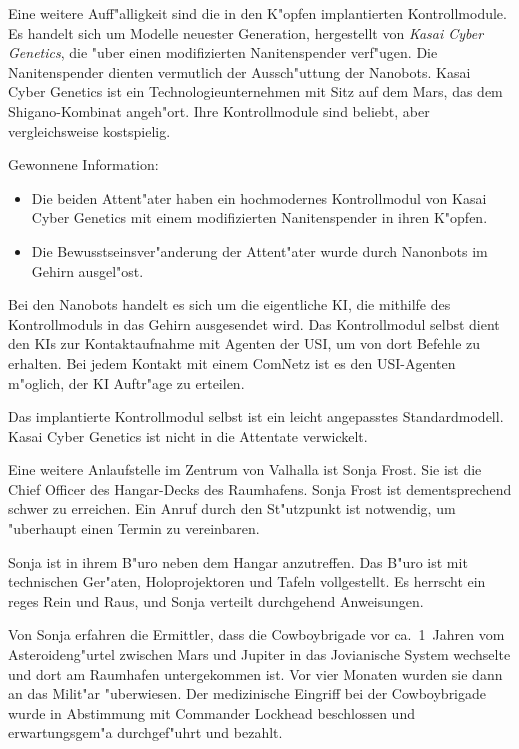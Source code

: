 Eine weitere Auff"alligkeit sind die in den K"opfen implantierten Kontrollmodule. Es handelt sich um Modelle neuester Generation, hergestellt von \emph{Kasai Cyber Genetics}, die "uber einen modifizierten Nanitenspender verf"ugen. Die Nanitenspender dienten vermutlich der Aussch"uttung der Nanobots. Kasai Cyber Genetics ist ein Technologieunternehmen mit Sitz auf dem Mars, das dem Shigano-Kombinat angeh"ort. Ihre Kontrollmodule sind beliebt, aber vergleichsweise kostspielig.
\vfill

\begin{remarks}
	Gewonnene Information: 
	
	\begin{itemize}
		\item Die beiden Attent"ater haben ein hochmodernes Kontrollmodul von Kasai Cyber Genetics mit einem modifizierten Nanitenspender in 	ihren K"opfen.
		\item Die Bewusstseinsver"anderung der Attent"ater wurde durch Nanonbots im Gehirn ausgel"ost.
	\end{itemize}
	
	Bei den Nanobots handelt es sich um die eigentliche KI, die mithilfe des Kontrollmoduls in das Gehirn ausgesendet wird. Das Kontrollmodul selbst dient den KIs zur Kontaktaufnahme mit Agenten der USI, um von dort Befehle zu erhalten. Bei jedem Kontakt mit einem ComNetz ist es den USI-Agenten m"oglich, der KI Auftr"age zu erteilen.

	Das implantierte Kontrollmodul selbst ist ein leicht angepasstes Standardmodell. Kasai Cyber Genetics ist nicht in die Attentate verwickelt.
\end{remarks}


Eine weitere Anlaufstelle im Zentrum von Valhalla ist Sonja Frost. Sie ist die Chief Officer des Hangar-Decks des Raumhafens. Sonja Frost ist dementsprechend schwer zu erreichen. Ein Anruf durch den St"utzpunkt ist notwendig, um "uberhaupt einen Termin zu vereinbaren.

Sonja ist in ihrem B"uro neben dem Hangar anzutreffen. Das B"uro ist mit technischen Ger"aten, Holoprojektoren und Tafeln vollgestellt. Es herrscht ein reges Rein und Raus, und Sonja verteilt durchgehend Anweisungen.

Von Sonja erfahren die Ermittler, dass die Cowboybrigade vor ca.~1\half~Jahren vom Asteroideng"urtel zwischen Mars und Jupiter in das Jovianische System wechselte und dort am Raumhafen untergekommen ist. Vor vier Monaten wurden sie dann an das Milit"ar "uberwiesen. Der medizinische Eingriff bei der Cowboybrigade wurde in Abstimmung mit Commander Lockhead beschlossen und erwartungsgem"a\3 durchgef"uhrt und bezahlt.


